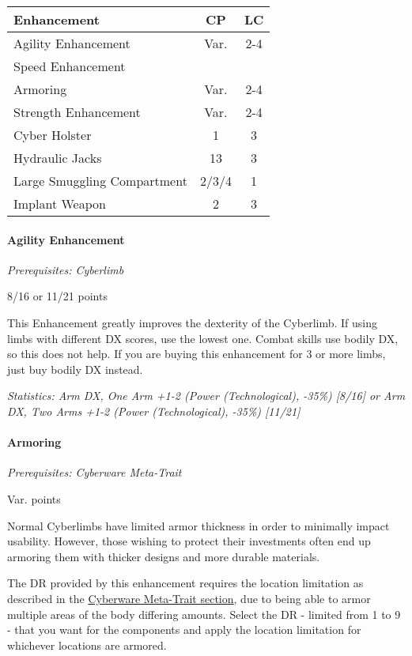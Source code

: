 \begin{multicols*}{3}
	\begin{center}
		\begin{tabularx}{0.33\textwidth}{|X|c|c|}
			\hline
			Enhancement & CP & LC\\
			\hline
			\hline
			Agility Enhancement & Var. & 2-4 \\
			Speed Enhancement & & \\
			Armoring & Var. & 2-4 \\
			Strength Enhancement & Var. & 2-4 \\
			Cyber Holster & 1 & 3 \\
			Hydraulic Jacks & 13 & 3 \\
			Large Smuggling Compartment & 2/3/4 & 1\\
			Implant Weapon & 2 & 3 \\
			\hline
		\end{tabularx}
	\end{center}
	
	\paragraph{Agility Enhancement}
	\textit{Prerequisites: Cyberlimb}
	\begin{flushright}
		8/16 or 11/21 points
	\end{flushright}
	
	This Enhancement greatly improves the dexterity of the Cyberlimb. If using limbs with different DX scores, use the lowest one. Combat skills use bodily DX, so this does not help. If you are buying this enhancement for 3 or more limbs, just buy bodily DX instead. 
	
	\textit{\textcolor{OliveGreen}{Statistics: Arm DX, One Arm +1-2 (Power (Technological), -35\%) [8/16] or Arm DX, Two Arms +1-2 (Power (Technological), -35\%) [11/21]}}
	
	\paragraph{Armoring}
	\textit{Prerequisites: Cyberware Meta-Trait}
	\begin{flushright}
		Var. points
	\end{flushright}
	
	Normal Cyberlimbs have limited armor thickness in order to minimally impact usability. However, those wishing to protect their investments often end up armoring them with thicker designs and more durable materials.
	
	The DR provided by this enhancement requires the location limitation as described in the \hyperref[cyberware-meta-trait]{Cyberware Meta-Trait section}, due to being able to armor multiple areas of the body differing amounts. Select the DR - limited from 1 to 9 - that you want for the components and apply the location limitation for whichever locations are armored.
	

\end{multicols*}
